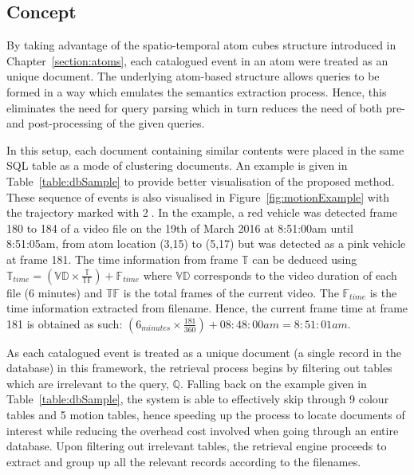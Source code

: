 \subsection{Concept}
\label{versionOneConcept}
By taking advantage of the spatio-temporal atom cubes structure introduced in Chapter~\ref{section:atoms}, each catalogued event in an atom were treated as an unique document. The underlying atom-based structure allows queries to be formed in a way which emulates the semantics extraction process. Hence, this eliminates the need for query parsing which in turn reduces the need of both pre- and post-processing of the given queries.

In this setup, each document containing similar contents were placed in the same SQL table as a mode of clustering documents. An example is given in Table~\ref{table:dbSample} to provide better visualisation of the proposed method. These sequence of events is also visualised in Figure~\ref{fig:motionExample} with the trajectory marked with \textcircled{2}.
In the example, a red vehicle was detected frame 180 to 184 of a video file on the 19th of March 2016 at 8:51:00am until 8:51:05am, from atom location (3,15) to (5,17) but was detected as a pink vehicle at frame 181.
The time information from frame $\mathbb{T}$ can be deduced using $\mathbb{T}_{time}  = (\mathbb{VD} \times \frac{\mathbb{T}}{\mathbb{TF}}) + \mathbb{F}_{time}$ where $\mathbb{VD}$ corresponds to the video duration of each file (6 minutes) and $\mathbb{TF}$ is the total frames of the current video. The $\mathbb{F}_{time}$ is the time information extracted from filename.
Hence, the current frame time at frame 181 is obtained as such: $(6_{minutes} \times \frac{181}{360}) + 08:48:00am = 8:51:01am$.

As each catalogued event is treated as a unique document (a single record in the database) in this framework, the retrieval process begins by filtering out tables which are irrelevant to the query, $\mathbb{Q}$. Falling back on the example given in Table~\ref{table:dbSample}, the system is able to effectively skip through 9 colour tables and 5 motion tables, hence speeding up the process to locate documents of interest while reducing the overhead cost involved when going through an entire database. Upon filtering out irrelevant tables, the retrieval engine proceeds to extract and group up all the relevant records according to the filenames.

